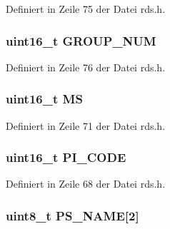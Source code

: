 Definiert in Zeile 75 der Datei rds.\+h.

\hypertarget{structgroup__0a_a9f692e9f76ee88348d426bcd4e9bc70b}{}
\subsubsection[{G\+R\+O\+U\+P\+\_\+\+N\+U\+M}]{\setlength{\rightskip}{0pt plus 5cm}uint16\+\_\+t G\+R\+O\+U\+P\+\_\+\+N\+U\+M}\label{structgroup__0a_a9f692e9f76ee88348d426bcd4e9bc70b}


Definiert in Zeile 76 der Datei rds.\+h.

\hypertarget{structgroup__0a_a0d87191040df43fdd9f67487d0cc1a45}{}
\subsubsection[{M\+S}]{\setlength{\rightskip}{0pt plus 5cm}uint16\+\_\+t M\+S}\label{structgroup__0a_a0d87191040df43fdd9f67487d0cc1a45}


Definiert in Zeile 71 der Datei rds.\+h.

\hypertarget{structgroup__0a_a5cd9b1f6413028425796c1129aa8fd87}{}
\subsubsection[{P\+I\+\_\+\+C\+O\+D\+E}]{\setlength{\rightskip}{0pt plus 5cm}uint16\+\_\+t P\+I\+\_\+\+C\+O\+D\+E}\label{structgroup__0a_a5cd9b1f6413028425796c1129aa8fd87}


Definiert in Zeile 68 der Datei rds.\+h.

\hypertarget{structgroup__0a_a80447425671c19133df16d620705bb09}{}
\subsubsection[{P\+S\+\_\+\+N\+A\+M\+E}]{\setlength{\rightskip}{0pt plus 5cm}uint8\+\_\+t P\+S\+\_\+\+N\+A\+M\+E\mbox{[}2\mbox{]}}\label{structgroup__0a_a80447425671c19133df16d620705bb09}


